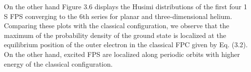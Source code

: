 On the other hand Figure 3.6 displays the Husimi distributions of the first four 1 S FPS converging to the 6th series for planar and three-dimensional helium. Comparing these plots with the classical configuration, we observe that the maximum of the probability density of the ground state is localized at the equilibrium position of the outer electron in the classical FPC given by Eq. (3.2). On the other hand, excited FPS are localized along periodic orbits with higher energy of the classical configuration.

